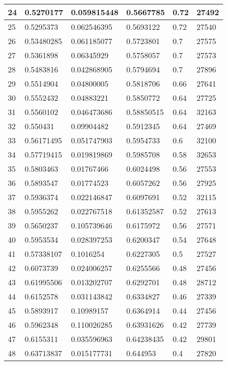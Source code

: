 \begin{longtable}{|l|l|l|l|l|l|}
24 & 0.5270177 & 0.059815448 & 0.5667785 & 0.72 & 27492 \\ \hline 
25 & 0.5295373 & 0.062546395 & 0.5693122 & 0.72 & 27540 \\ \hline 
26 & 0.53480285 & 0.061185077 & 0.5723801 & 0.7 & 27575 \\ \hline 
27 & 0.5361898 & 0.06345929 & 0.5758057 & 0.7 & 27573 \\ \hline 
28 & 0.5483816 & 0.042868905 & 0.5794694 & 0.7 & 27896 \\ \hline 
29 & 0.5514904 & 0.04800005 & 0.5818706 & 0.66 & 27641 \\ \hline 
30 & 0.5552432 & 0.04883221 & 0.5850772 & 0.64 & 27725 \\ \hline 
31 & 0.5560102 & 0.046473686 & 0.58850515 & 0.64 & 32163 \\ \hline 
32 & 0.550431 & 0.09904482 & 0.5912345 & 0.64 & 27469 \\ \hline 
33 & 0.56171495 & 0.051747903 & 0.5954733 & 0.6 & 32100 \\ \hline 
34 & 0.57719415 & 0.019819869 & 0.5985708 & 0.58 & 32653 \\ \hline 
35 & 0.5803463 & 0.01767466 & 0.6024498 & 0.56 & 27553 \\ \hline 
36 & 0.5893547 & 0.01774523 & 0.6057262 & 0.56 & 27925 \\ \hline 
37 & 0.5936374 & 0.022146847 & 0.6097691 & 0.52 & 32115 \\ \hline 
38 & 0.5955262 & 0.022767518 & 0.61352587 & 0.52 & 27613 \\ \hline 
39 & 0.5650237 & 0.105739646 & 0.6175972 & 0.56 & 27571 \\ \hline 
40 & 0.5953534 & 0.028397253 & 0.6200347 & 0.54 & 27648 \\ \hline 
41 & 0.57338107 & 0.1016254 & 0.6227305 & 0.5 & 27527 \\ \hline 
42 & 0.6073739 & 0.024006257 & 0.6255566 & 0.48 & 27456 \\ \hline 
43 & 0.61995506 & 0.013202707 & 0.6292701 & 0.48 & 28712 \\ \hline 
44 & 0.6152578 & 0.031143842 & 0.6334827 & 0.46 & 27339 \\ \hline 
45 & 0.5893917 & 0.10989157 & 0.6364914 & 0.44 & 27456 \\ \hline 
46 & 0.5962348 & 0.110026285 & 0.63931626 & 0.42 & 27739 \\ \hline 
47 & 0.6155311 & 0.035596963 & 0.64238435 & 0.42 & 29801 \\ \hline 
48 & 0.63713837 & 0.015177731 & 0.644953 & 0.4 & 27820 \\ \hline 

\end{longtable}

